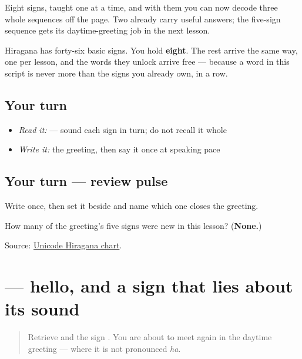 \begin{grammarlens}[title={What you've built}]
Eight signs, taught one at a time, and with them you can now decode three whole sequences off the page. Two already carry useful answers; the five-sign sequence gets its daytime-greeting job in the next lesson.

Hiragana has forty-six basic signs. You hold \textbf{eight}. The rest arrive the same way, one per lesson, and the words they unlock arrive free — because a word in this script is never more than the signs you already own, in a row.
\end{grammarlens}

\subsection*{Your turn}
\begin{itemize}
\raggedright
  \item \emph{Read it:} \textbf{} — sound each sign in turn; do not recall it whole
  \item \emph{Write it:} the greeting, then say it once at speaking pace
\end{itemize}

\subsection*{Your turn — review pulse}
Write \textbf{} once, then set it beside \textbf{} and name which one closes the greeting.

\begin{tcolorbox}[breakable,colback=teal!4,colframe=teal!35!black,title={Before you move on}]
How many of the greeting's five signs were new in this lesson? (\textbf{None.})

Source: \href{https://www.unicode.org/charts/PDF/U3040.pdf}{Unicode Hiragana chart}.
\end{tcolorbox}
\section[\texorpdfstring{\ja{こんにちは} (konnichiwa)}{こんにちは (konnichiwa)}]{ — hello, and a sign that lies about its sound}

\label{lesson:JA-C01-konnichiwa}



\begin{quote}
Retrieve \textbf{} and the sign \textbf{}. You are about to meet \textbf{} again in the daytime greeting — where it is not pronounced \emph{ha}.
\end{quote}

